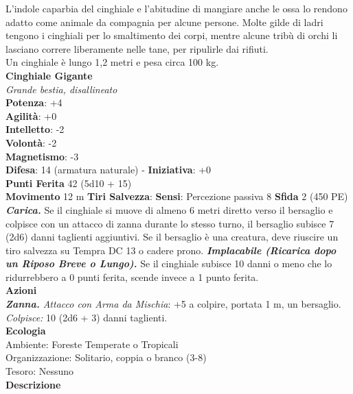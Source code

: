 \begin{multicols}{2}
L'indole caparbia del cinghiale e l'abitudine di mangiare anche le ossa lo rendono adatto come animale da compagnia per alcune persone. Molte gilde di ladri tengono i cinghiali per lo smaltimento dei corpi, mentre alcune tribù di orchi li lasciano correre liberamente nelle tane, per ripulirle dai rifiuti.\\

Un cinghiale è lungo 1,2 metri e pesa circa 100 kg.\\


\medskip\textbf{Cinghiale Gigante}\\
\emph{Grande bestia, disallineato}\\
\textbf{Potenza}: +4\\
\textbf{Agilità}: +0\\
\textbf{Intelletto}: -2\\
\textbf{Volontà}: -2\\
\textbf{Magnetismo}: -3\\
\textbf{Difesa}: 14 (armatura naturale) - \textbf{Iniziativa}: +0\\
\textbf{Punti Ferita} 42 (5d10 + 15)\\
 

\textbf{Movimento} 12 m
\textbf{Tiri Salvezza}:
\textbf{Sensi}: Percezione passiva 8
\textbf{Sfida} 2 (450 PE)\smallskip\\
\emph{\textbf{Carica.}} Se il cinghiale si muove di almeno 6 metri diretto verso il bersaglio e colpisce con un attacco di zanna durante lo stesso turno, il bersaglio subisce 7 (2d6) danni taglienti aggiuntivi. Se il bersaglio è una creatura, deve riuscire un tiro salvezza su Tempra DC 13 o cadere prono.
\emph{\textbf{Implacabile (Ricarica dopo un Riposo Breve o Lungo).}} Se il cinghiale subisce 10 danni o meno che lo ridurrebbero a 0 punti ferita, scende invece a 1 punto ferita.\\
\smallskip\textbf{Azioni}\\
\emph{\textbf{Zanna.} Attacco con Arma da Mischia}: +5 a colpire, portata 1 m, un bersaglio.\\
\emph{Colpisce:} 10 (2d6 + 3) danni taglienti.\\
\textbf{Ecologia}\\
Ambiente: Foreste Temperate o Tropicali\\
Organizzazione: Solitario, coppia o branco (3-8)\\
Tesoro: Nessuno\\
\textbf{Descrizione}\\


\end{multicols}

